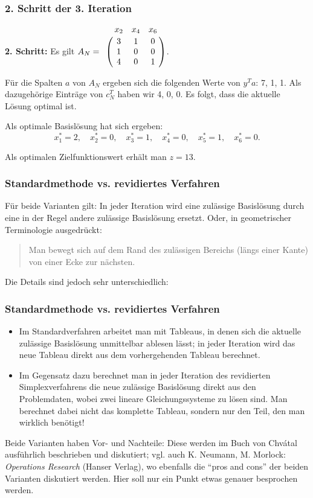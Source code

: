 \documentclass[smaller]{beamer}
\begin{document}
\begin{frame}
 \frametitle{2. Schritt der 3. Iteration}
\textbf{2. Schritt:} Es gilt $A_N = \bordermatrix{ & x_2 & x_4 & x_6 \cr & 3 & 1 & 0 \cr & 1 & 0 & 0 \cr & 4 & 0 & 1 }$. \\ \vspace*{0.2cm}

Für die Spalten $a$ von $A_N$ ergeben sich die folgenden Werte von $y^Ta$: 7, 1, 1. Als dazugehörige Einträge von $c_N^T$ haben wir 4, 0, 0. \alert{Es folgt, dass die aktuelle Lösung optimal ist.} \\ \vspace*{0.2cm}

Als \alert{optimale Basislösung} hat sich ergeben:
\[
x_1^*=2,\quad
x_2^*=0,\quad
x_3^*=1,\quad
x_4^*=0,\quad
x_5^*=1,\quad
x_6^*=0.
\]

Als \alert{optimalen Zielfunktionswert} erhält man $z=13$.
\end{frame}

\begin{frame}
 \frametitle{Standardmethode vs. revidiertes Verfahren}
 Für beide Varianten gilt: \alert{In jeder Iteration wird eine zulässige Basislösung durch eine in der Regel andere zulässige Basislösung ersetzt}. Oder, in geometrischer Terminologie ausgedrückt:
\begin{quote} 
\alert{Man bewegt sich auf dem Rand des zulässigen Bereichs ({\glqq}längs einer Kante{\grqq}) von einer Ecke zur nächsten.}
\end{quote}

Die \alert{Details} sind jedoch sehr unterschiedlich:
\end{frame}

\begin{frame}
 \frametitle{Standardmethode vs. revidiertes Verfahren}
 \begin{itemize}
\item Im Standardverfahren arbeitet man mit \alert{Tableaus}, in denen sich die aktuelle zulässige Basislösung unmittelbar ablesen lässt; \alert{in jeder Iteration wird das neue Tableau direkt aus dem vorhergehenden Tableau berechnet}.
\item Im Gegensatz dazu berechnet man in jeder Iteration des revidierten Simplexverfahrens die neue zulässige Basislösung direkt \alert{aus den Problemdaten}, wobei zwei lineare Gleichungssysteme zu lösen sind. \alert{Man berechnet dabei nicht das komplette Tableau, sondern nur den Teil, den man wirklich benötigt!}
\end{itemize}

Beide Varianten haben \alert{Vor- und Nachteile:} Diese werden im Buch von Chvátal ausführlich beschrieben und diskutiert; vgl. auch K. Neumann, M. Morlock: \textit{Operations Research} (Hanser Verlag), wo ebenfalls die ``pros and cons'' der beiden Varianten diskutiert werden. Hier soll nur ein Punkt etwas genauer besprochen werden.
\end{frame}
\end{document}

